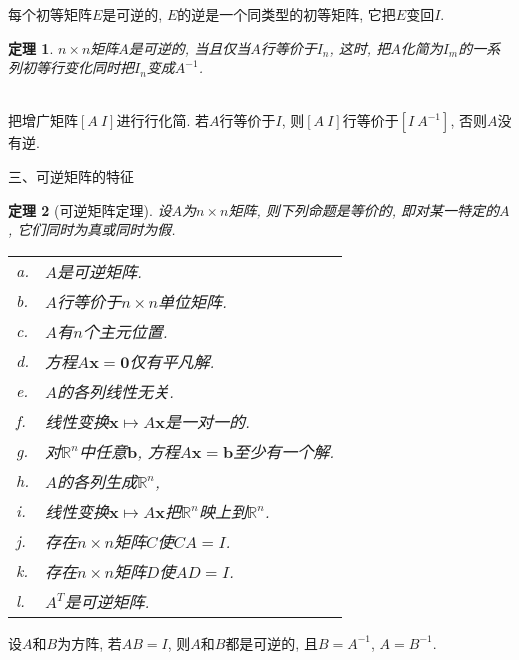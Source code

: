 \documentclass[UTF8,fontset=ubuntu]{ctexart}
\theoremstyle{plain}
\newtheorem{theorem}{定理}
\theoremstyle{nonumberplain}
\theoremstyle{empty}
\begin{document}
\begin{law}
每个初等矩阵$E$是可逆的, $E$的逆是一个同类型的初等矩阵, 它把$E$变回$I$.
\end{law}\vspace{4ex}

\begin{theorem}
$n\times n$矩阵$A$是可逆的, 当且仅当$A$行等价于$I_n$, 这时, 把$A$化简为$I_m$的一系列初等行变化同时把$I_n$变成$A^{-1}$.
\end{theorem}\vspace{4ex}

\begin{law}[求$A^{-1}$的算法]\ \\
把增广矩阵$[A\ I]$进行行化简. 若$A$行等价于$I$, 则$[A\ I]$行等价于$[I\ A^{-1}]$, 否则$A$没有逆.
\end{law}\vspace{8ex}

三、可逆矩阵的特征\\[-3ex]
\begin{theorem}[可逆矩阵定理]
设$A$为$n\times n$矩阵, 则下列命题是等价的, 即对某一特定的$A$, 它们同时为真或同时为假.\\
\begin{tabular}{l@{\ }l}
a. & $A$是可逆矩阵.\\
b. & $A$行等价于$n\times n$单位矩阵.\\
c. & $A$有$n$个主元位置.\\
d. & 方程$A\bm{x}=\bm{0}$仅有平凡解.\\
e. & $A$的各列线性无关.\\
f. & 线性变换$\bm{x}\mapsto A\bm{x}$是一对一的.\\
g. & 对$\mathbb{R}^n$中任意$\bm{b}$, 方程$A\bm{x}=\bm{b}$至少有一个解.\\
h. & $A$的各列生成$\mathbb{R}^n$,\\
i. & 线性变换$\bm{x}\mapsto A\bm{x}$把$\mathbb{R}^n$映上到$\mathbb{R}^n$.\\
j. & 存在$n\times n$矩阵$C$使$CA=I$.\\
k. & 存在$n\times n$矩阵$D$使$AD=I$.\\
l. & $A^T$是可逆矩阵.
\end{tabular}
\end{theorem}\vspace{4ex}

\begin{law}
设$A$和$B$为方阵, 若$AB=I$, 则$A$和$B$都是可逆的, 且$B=A^{-1}$, $A=B^{-1}$.
\end{law}\vspace{4ex}
\end{document}
